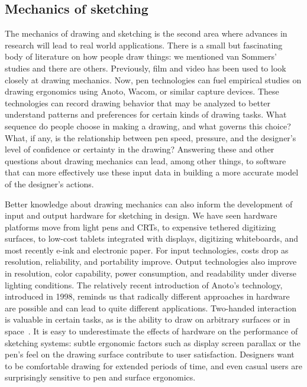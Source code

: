 \subsection{Mechanics of sketching}
The mechanics of drawing and sketching is the second area where
advances in research will lead to real world applications. There is a
small but fascinating body of literature on how people draw things: we
mentioned van Sommers' studies and there are others. Previously, film
and video has been used to look closely at drawing mechanics. Now, pen
technologies can fuel empirical studies on drawing ergonomics using
Anoto, Wacom, or similar capture devices. These technologies can
record drawing behavior that may be analyzed to better understand
patterns and preferences for certain kinds of drawing tasks. What
sequence do people choose in making a drawing, and what governs this
choice? What, if any, is the relationship between pen speed, pressure,
and the designer's level of confidence or certainty in the drawing?
Answering these and other questions about drawing mechanics can lead,
among other things, to software that can more effectively use these
input data in building a more accurate model of the designer's
actions.

Better knowledge about drawing mechanics can also inform the
development of input and output hardware for sketching in design. We
have seen hardware platforms move from light pens and CRTs, to
expensive tethered digitizing surfaces, to low-cost tablets integrated
with displays, digitizing whiteboards, and most recently e-ink and
electronic paper. For input technologies, costs drop as resolution,
reliability, and portability improve. Output technologies also improve
in resolution, color capability, power consumption, and readability
under diverse lighting conditions. The relatively recent introduction
of Anoto's technology, introduced in 1998, reminds us that radically
different approaches in hardware are possible and can lead to quite
different applications. Two-handed interaction~\cite{kurtenbach-t3} is
valuable in certain tasks, as is the ability to draw on arbitrary
surfaces or in space~\cite{schkolne-shape-sculpt}. It is easy to
underestimate the effects of hardware on the performance of sketching
systems: subtle ergonomic factors such as display screen parallax or
the pen's feel on the drawing surface contribute to user
satisfaction. Designers want to be comfortable drawing for extended
periods of time, and even casual users are surprisingly sensitive to
pen and surface ergonomics.

